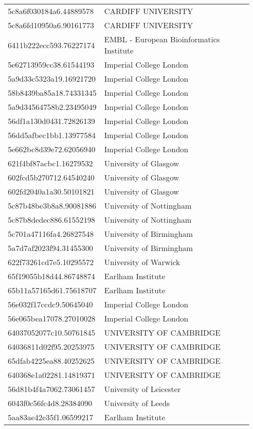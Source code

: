 \begin{tabular}{ll}
5c8a6f030184a6.44889578 & CARDIFF UNIVERSITY \\
5c8a6fd10950a6.90161773 & CARDIFF UNIVERSITY \\
6411b222ecc593.76227174 & EMBL - European Bioinformatics Institute \\
5e62713959cc38.61544193 & Imperial College London \\
5a9d33c5323a19.16921720 & Imperial College London \\
58b8439ba85a18.74331345 & Imperial College London \\
5a9d34564758b2.23495049 & Imperial College London \\
56df1a130d0431.72826139 & Imperial College London \\
56dd5afbec1bb1.13977584 & Imperial College London \\
5e662bc8d39e72.62056940 & Imperial College London \\
621f4bf87acbc1.16279532 & University of Glasgow \\
602fcd5b270712.64540240 & University of Glasgow \\
602fd2040a1a30.50101821 & University of Glasgow \\
5c87b48be3b8a8.90081886 & University of Nottingham \\
5c87b8dedec886.61552198 & University of Nottingham \\
5c701a47116fa4.26827548 & University of Birmingham \\
5a7d7af2023f94.31455300 & University of Birmingham \\
622f73261cd7e5.10295572 & University of Warwick \\
65f19055b18d44.86748874 & Earlham Institute \\
65b11a57165d61.75618707 & Earlham Institute \\
56e032f17ccdc9.50645040 & Imperial College London \\
56e065bea17078.27010028 & Imperial College London \\
64037052077c10.50761845 & UNIVERSITY OF CAMBRIDGE \\
64036811d02f95.20253975 & UNIVERSITY OF CAMBRIDGE \\
65dfab4225ea88.40252625 & UNIVERSITY OF CAMBRIDGE \\
640368e1a02281.14819371 & UNIVERSITY OF CAMBRIDGE \\
56d81b4f4a7062.73061457 & University of Leicester \\
6043f0c56fc4d8.28384090 & University of Leeds \\
5aa83ae42e35f1.06599217 & Earlham Institute \\

\end{tabular}
